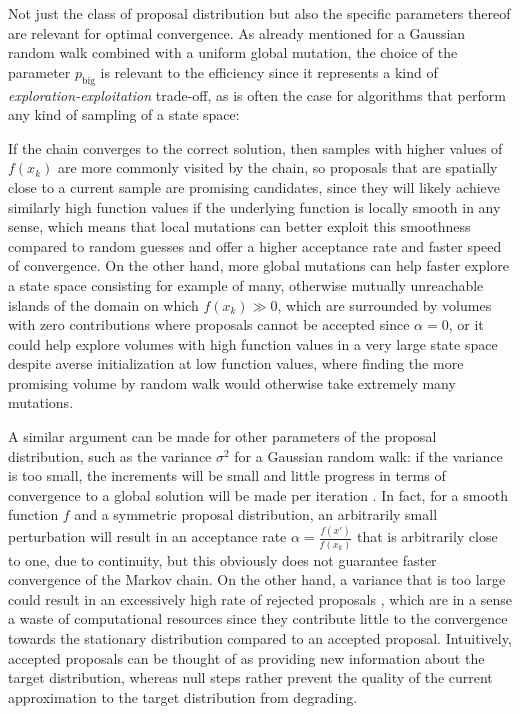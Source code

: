 \documentclass[oneside, a4paper]{article}
\begin{document}
Not just the class of proposal distribution but also the specific parameters thereof are relevant for optimal convergence. As already mentioned for a Gaussian random walk combined with a uniform global mutation, the choice of the parameter $p_\text{big}$ is relevant to the efficiency since it represents a kind of \textit{exploration-exploitation} trade-off, as is often the case for algorithms that perform any kind of sampling of a state space:

If the chain converges to the correct solution, then samples with higher values of $f(x_k)$ are more commonly visited by the chain, so proposals that are spatially close to a current sample are promising candidates, since they will likely achieve similarly high function values if the underlying function is locally smooth in any sense, which means that local mutations can better exploit this smoothness compared to random guesses and offer a higher acceptance rate and faster speed of convergence. On the other hand, more global mutations can help faster explore a state space consisting for example of many, otherwise mutually unreachable islands of the domain on which $f(x_k)\gg 0$, which are surrounded by volumes with zero contributions where proposals cannot be accepted since $\alpha = 0$, or it could help explore volumes with high function values in a very large state space despite averse initialization at low function values, where finding the more promising volume by random walk would otherwise take extremely many mutations.

A similar argument can be made for other parameters of the proposal distribution, such as the variance $\sigma^2$ for a Gaussian random walk: if the variance is too small, the increments will be small and little progress in terms of convergence to a global solution will be made per iteration \autocite{optimal-mcmc-scaling}. In fact, for a smooth function $f$ and a symmetric proposal distribution, an arbitrarily small perturbation will result in an acceptance rate $\alpha = \frac{f(x')}{f(x_k)}$ that is arbitrarily close to one, due to continuity, but this obviously does not guarantee faster convergence of the Markov chain. 
On the other hand, a variance that is too large could result in an excessively high rate of rejected proposals \autocite{optimal-mcmc-scaling}, which are in a sense a waste of computational resources since they contribute little to the convergence towards the stationary distribution compared to an accepted proposal. Intuitively, accepted proposals can be thought of as providing new information about the target distribution, whereas null steps rather prevent the quality of the current approximation to the target distribution from degrading.\\
\end{document}
